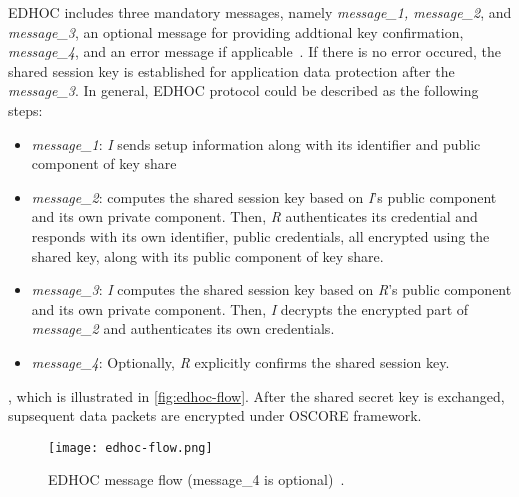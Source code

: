 EDHOC includes three mandatory messages, namely
\textit{message\_1, message\_2}, and \textit{message\_3}, an optional message for providing
addtional key confirmation, \textit{message\_4},
and an error message if applicable~\cite{edhoc-rfc}. If there is no error occured, the shared
session key is established for application data protection after the \textit{message\_3}.
In general, EDHOC protocol could be described as the following steps:
\begin{itemize}
    \item \textit{message\_1}: \textit{I} sends setup information along with its identifier and
    public component of key share
    \item \textit{message\_2}:  computes the shared session key based on \textit{I}'s public component
    and its own private component. Then, \textit{R} authenticates its credential and responds
    with its own identifier,
    public credentials, all encrypted using the shared key, along with its public
    component of key share.
    \item \textit{message\_3}: \textit{I} computes the shared session key based on \textit{R}'s public component
    and its own private component. Then, \textit{I} decrypts the encrypted part of \textit{message\_2}
    and authenticates its own credentials.
    \item \textit{message\_4}: Optionally, \textit{R} explicitly confirms the shared session key.
\end{itemize}
, which is illustrated in \autoref{fig:edhoc-flow}.
After the shared secret key is exchanged, supsequent data packets are encrypted under OSCORE framework. 

\begin{figure}[h!]
    \centering
    \texttt{[image: edhoc-flow.png]}
    \caption{EDHOC message flow (message\_4 is optional)~\cite{edhoc-rfc}.}
    \label{fig:edhoc-flow}
\end{figure}

